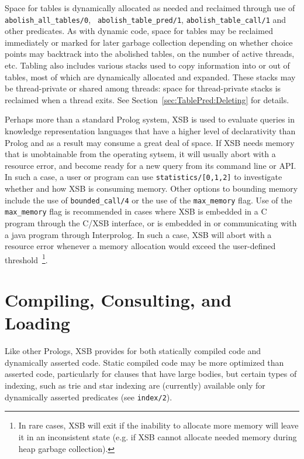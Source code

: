 Space for tables is dynamically allocated as needed and reclaimed
through use of {\tt abolish\_all\_tables/0}, {\tt
  abolish\_table\_pred/1}, {\tt abolish\_table\_call/1} and other
predicates.  As with dynamic code, space for tables may be reclaimed
immediately or marked for later garbage collection depending on
whether choice points may backtrack into the abolished tables, on the
number of active threads, etc.  Tabling also includes various stacks
used to copy information into or out of tables, most of which are
dynamically allocated and expanded.  These stacks may be
thread-private or shared among threads: space for thread-private
stacks is reclaimed when a thread exits.  See
Section~\ref{sec:TablePred:Deleting} for details.

Perhaps more than a standard Prolog system, XSB is used to evaluate
queries in knowledge representation languages that have a higher level
of declarativity than Prolog and as a result may consume a great deal
of space.  If XSB needs memory that is unobtainable from the operating
sytsem, it will usually abort with a resource error, and become ready
for a new query from its command line or API.  In such a case, a user
or program can use {\tt statistics/[0,1,2]} to investigate whether and
how XSB is consuming memory.  Other options to bounding memory include
the use of {\tt bounded\_call/4} or the use of the {\tt max\_memory}
flag.  Use of the {\tt max\_memory} flag is recommended in cases where
XSB is embedded in a C program through the C/XSB interface, or is
embedded in or communicating with a java program through Interprolog.
In such a case, XSB will abort with a resource error whenever a memory
allocation would exceed the user-defined threshold~\footnote{In rare
  cases, XSB will exit if the inability to allocate more memory will
  leave it in an inconsistent state (e.g. if XSB cannot allocate
  needed memory during heap garbage collection).}.

\section{Compiling, Consulting, and Loading} \label{Consulting}
Like other Prologs, XSB provides for both statically compiled code and
dynamically asserted code.  Static compiled code may be more optimized
than asserted code, particularly for clauses that have large bodies,
but certain types of indexing, such as trie and star indexing are
(currently) available only for dynamically asserted predicates (see
{\tt index/2}).

